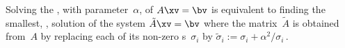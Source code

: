 \begin{theorem} \label{thm:Tikreg}
Solving the , with parameter~\(\alpha\), of \(A\xv=\bv\) is equivalent to finding the smallest, , solution of the system \(\tilde A\xv=\bv\) where  
the matrix~\(\tilde A\) is obtained from~\(A\) by replacing each of its non-zero s~\(\sigma_i\) by \(\tilde\sigma_i:=\sigma_i+\alpha^2/\sigma_i\)\,.
\end{theorem}

